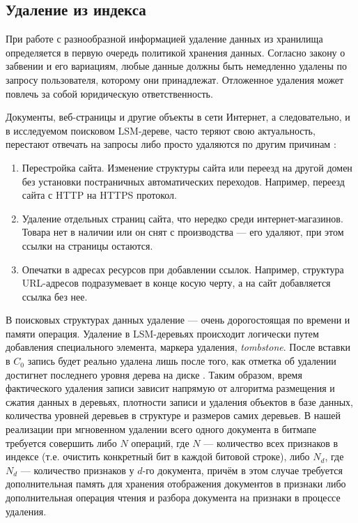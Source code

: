 \subsection{Удаление из индекса}

При работе с разнообразной информацией удаление данных из хранилища определяется
в первую очередь политикой хранения данных. Согласно закону о забвении и его
вариациям, любые данные должны быть немедленно удалены по запросу пользователя,
которому они принадлежат. Отложенное удаления может повлечь за собой юридическую
ответственность.

Документы, веб-страницы и другие объекты в сети Интернет, а следовательно, и в
исследуемом поисковом LSM-дереве, часто теряют свою актуальность, перестают
отвечать на запросы либо просто удаляются по другим причинам \cite{Dangling:2018}:
\begin{enumerate}
    \item Перестройка сайта. Изменение структуры сайта или переезд на другой
    домен без установки постраничных автоматических переходов. Например,
    переезд сайта с HTTP на HTTPS протокол.
    \item Удаление отдельных страниц сайта, что нередко среди интернет-магазинов.
    Товара нет в наличии или он снят с производства — его удаляют, при этом 
    ссылки на страницы остаются.
    \item Опечатки в адресах ресурсов при добавлении ссылок. Например, структура
    URL-адресов подразумевает в конце косую черту, а на сайт добавляется ссылка
    без нее.
\end{enumerate}

В поисковых структурах данных удаление — очень дорогостоящая по времени и
памяти операция. Удаление в
LSM-деревьях происходит логически путем добавления специального элемента, маркера 
удаления, \textit{tombstone}. После вставки в $C_0$ запись будет реально удалена
лишь после того, как отметка об удалении достигнет последнего уровня дерева на
диске \cite{ONeil:1996}. Таким образом, время фактического удаления записи зависит напрямую от
алгоритма размещения и сжатия данных в деревьях, плотности записи и удаления
объектов в базе данных, количества уровней деревьев в структуре и размеров самих
деревьев. В нашей реализации при мгновенном удалении всего одного документа в
битмапе требуется совершить либо $N$ операций, где $N$ — количество всех признаков
в индексе (т.е. очистить конкретный бит в каждой битовой строке), либо $N_d$,
где $N_d$ — количество признаков у $d$-го документа, причём в этом случае требуется
дополнительная память для хранения отображения документов в признаки либо 
дополнительная операция чтения и разбора документа на признаки в процессе удаления.

